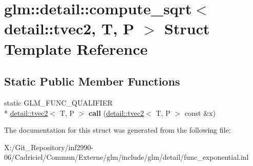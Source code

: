 \hypertarget{structglm_1_1detail_1_1compute__sqrt_3_01detail_1_1tvec2_00_01_t_00_01_p_01_4}{\section{glm\-:\-:detail\-:\-:compute\-\_\-sqrt$<$ detail\-:\-:tvec2, T, P $>$ Struct Template Reference}
\label{structglm_1_1detail_1_1compute__sqrt_3_01detail_1_1tvec2_00_01_t_00_01_p_01_4}
}
\subsection*{Static Public Member Functions}
\begin{DoxyCompactItemize}
\item 
\hypertarget{structglm_1_1detail_1_1compute__sqrt_3_01detail_1_1tvec2_00_01_t_00_01_p_01_4_aa1063e71bb3144910901a224d41d88f7}{static G\-L\-M\-\_\-\-F\-U\-N\-C\-\_\-\-Q\-U\-A\-L\-I\-F\-I\-E\-R \\*
\hyperlink{structglm_1_1detail_1_1tvec2}{detail\-::tvec2}$<$ T, P $>$ {\bfseries call} (\hyperlink{structglm_1_1detail_1_1tvec2}{detail\-::tvec2}$<$ T, P $>$ const \&x)}\label{structglm_1_1detail_1_1compute__sqrt_3_01detail_1_1tvec2_00_01_t_00_01_p_01_4_aa1063e71bb3144910901a224d41d88f7}

\end{DoxyCompactItemize}


The documentation for this struct was generated from the following file\-:\begin{DoxyCompactItemize}
\item 
X\-:/\-Git\-\_\-\-Repository/inf2990-\/06/\-Cadriciel/\-Commun/\-Externe/glm/include/glm/detail/func\-\_\-exponential.\-inl\end{DoxyCompactItemize}
